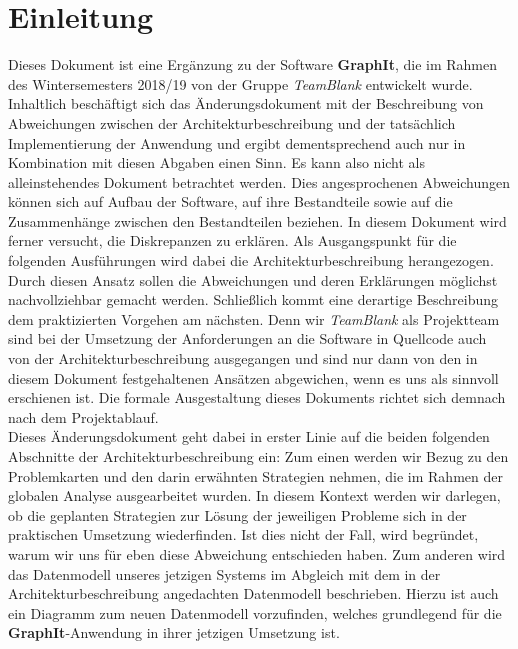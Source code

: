 \documentclass[enabledeprecatedfontcommands,fontsize=11pt,paper=a4,twoside]{scrartcl}
\renewcommand{\headrulewidth}{0pt}
\begin{document}
\thispagestyle{empty}
\cleardoublepage
\newpage

  \thispagestyle{fancy}
  \fancyhead{}
  \fancyfoot{}
  \renewcommand{\headrulewidth}{0.4pt}
  \tableofcontents


\newpage
\section{Einleitung}
Dieses Dokument ist eine Ergänzung zu der Software \textbf{GraphIt}, die im Rahmen des Wintersemesters 2018/19 von der Gruppe \textit{TeamBlank} entwickelt wurde. Inhaltlich beschäftigt sich das Änderungsdokument mit der Beschreibung von Abweichungen zwischen der Architekturbeschreibung und der tatsächlich Implementierung der Anwendung und ergibt dementsprechend auch nur in Kombination mit diesen Abgaben einen Sinn. Es kann also nicht als alleinstehendes Dokument betrachtet werden.  Dies angesprochenen Abweichungen können sich auf Aufbau der Software, auf ihre Bestandteile sowie auf die Zusammenhänge zwischen den Bestandteilen beziehen. In diesem Dokument wird ferner versucht, die Diskrepanzen zu erklären. Als Ausgangspunkt für die folgenden Ausführungen wird dabei die Architekturbeschreibung herangezogen. Durch diesen Ansatz sollen die Abweichungen und deren Erklärungen möglichst nachvollziehbar gemacht werden. Schließlich kommt eine derartige Beschreibung dem praktizierten Vorgehen am nächsten. Denn wir \textit{TeamBlank} als Projektteam sind bei der Umsetzung der Anforderungen an die Software in Quellcode auch von der Architekturbeschreibung ausgegangen und sind nur dann von den in diesem Dokument festgehaltenen Ansätzen abgewichen, wenn es uns als sinnvoll  erschienen ist. Die formale Ausgestaltung dieses Dokuments richtet sich demnach nach dem Projektablauf. \\ 
Dieses Änderungsdokument geht dabei in erster Linie auf die beiden folgenden Abschnitte der Architekturbeschreibung ein: Zum einen werden wir Bezug zu den Problemkarten und den darin erwähnten Strategien nehmen, die im Rahmen der globalen Analyse ausgearbeitet wurden. In diesem Kontext werden wir darlegen, ob die geplanten Strategien zur Lösung der jeweiligen Probleme sich in der praktischen Umsetzung wiederfinden. Ist dies nicht der Fall, wird begründet, warum wir uns für eben diese Abweichung entschieden haben. Zum anderen wird das Datenmodell unseres jetzigen Systems im Abgleich mit dem in der Architekturbeschreibung angedachten Datenmodell beschrieben. Hierzu ist auch ein Diagramm zum neuen Datenmodell vorzufinden, welches grundlegend für die \textbf{GraphIt}-Anwendung in ihrer jetzigen Umsetzung ist. \\
\end{document}
